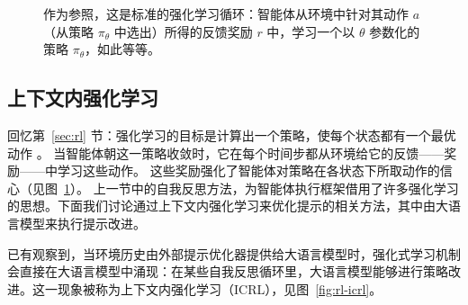 \begin{figure}
  \begin{center}
    
    \caption{作为参照，这是标准的强化学习循环：智能体从环境中针对其动作 $a$（从策略 $\pi_\theta$ 中选出）所得的反馈奖励 $r$ 中，学习一个以 $\theta$ 参数化的策略 $\pi_\theta$，如此等等。\citep{sutton2018reinforcement}}\label{fig:rl6}
  \end{center}
\end{figure}
\subsection{上下文内强化学习}\label{sec:icrl}
回忆第~\ref{sec:rl} 节：强化学习的目标是计算出一个策略，使每个状态都有一个最优动作 \citep{sutton2018reinforcement}。
当智能体朝这一策略收敛时，它在每个时间步都从环境给它的反馈——奖励——中学习这些动作。
这些奖励强化了智能体对策略在各状态下所取动作的信心（见图~\ref{fig:rl6}）。%
上一节中的自我反思方法，为智能体执行框架借用了许多强化学习的思想。下面我们讨论通过上下文内强化学习来优化提示的相关方法，其中由大语言模型来执行提示改进。





已有观察到，当环境历史由外部提示优化器提供给大语言模型时，强化式学习机制会直接在大语言模型中涌现：在某些自我反思循环里，大语言模型能够进行策略改进。这一现象被称为上下文内强化学习（ICRL）\citep{song2025reward}，见图~\ref{fig:rl-icrl}。%


